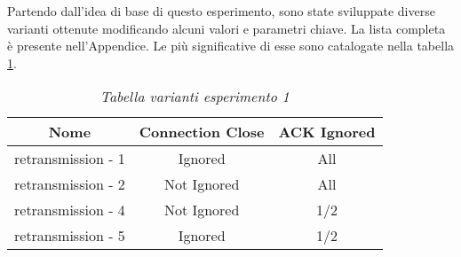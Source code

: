 Partendo dall'idea di base di questo esperimento, sono state sviluppate diverse varianti ottenute modificando alcuni valori e parametri chiave. 
La lista completa è presente nell'Appendice. Le più significative di esse sono catalogate nella tabella \ref{table-retransmission}.
\begin{table}[!h]
    \centering
    \begin{tabular}{|c|c|c|}
        \hline
        \textbf{Nome} & \textbf{Connection Close} & \textbf{ACK Ignored} \\
        \hline
        retransmission - 1  & Ignored & All \\
        \hline
        retransmission - 2 & Not Ignored & All \\
        \hline
        retransmission - 4 & Not Ignored & 1/2 \\
        \hline
        retransmission - 5 & Ignored & 1/2 \\
        \hline
    \end{tabular}
    \caption{\emph{Tabella varianti esperimento 1}}
    \label{table-retransmission}
\end{table}

